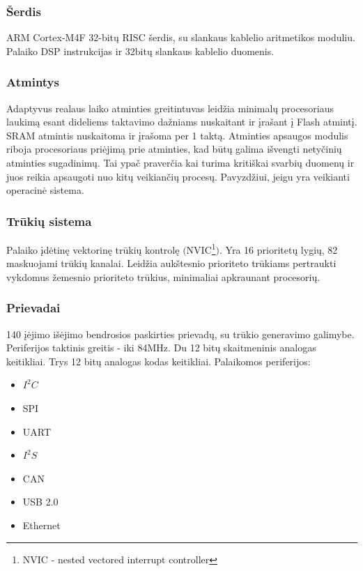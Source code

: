 \documentclass[a4paper, 12pt]{article} %
\begin{document}
\begin{onehalfspacing}
\subsubsection{\v{S}erdis}
ARM Cortex-M4F 32-bit\k{u} RISC \v{s}erdis, su slankaus kablelio aritmetikos moduliu. Palaiko DSP instrukcijas ir 32bit\k{u} slankaus kablelio duomenis.      


\subsubsection{Atmintys}
Adaptyvus realaus laiko atminties greitintuvas leid\v{z}ia minimal\k{u} procesoriaus laukim\k{a} esant dideliems taktavimo da\v{z}niams nuskaitant ir \k{i}ra\v{s}ant \k{i} Flash atmint\k{i}. SRAM atmintis nuskaitoma ir \k{i}ra\v{s}oma per 1 takt\k{a}. Atminties apsaugos modulis riboja procesoriaus pri\.ejim\k{a} prie atminties, kad b\=ut\k{u} galima i\v{s}vengti nety\v{c}ini\k{u} atminties sugadinim\k{u}. Tai ypa\v{c} praver\v{c}ia kai turima kriti\v{s}kai svarbi\k{u} duomen\k{u} ir juos reikia apsaugoti nuo kit\k{u} veikian\v{c}i\k{u} proces\k{u}. Pavyzd\v{z}iui, jeigu yra veikianti operacin\.e sistema.


\subsubsection{Tr\=uki\k{u} sistema}
Palaiko \k{i}d\.etin\k{e} vektorin\k{e} tr\=uki\k{u} kontrol\k{e} $($NVIC\footnote{NVIC - nested vectored interrupt controller}$)$.
Yra 16 prioritet\k{u} lygi\k{u}, 82 maskuojami tr\=uki\k{u} kanalai. Leid\v{z}ia auk\v{s}tesnio prioriteto tr\=ukiams pertraukti vykdomus \v{z}emesnio prioriteto tr\=ukius, minimaliai apkraunant procesori\k{u}. 


\subsubsection{Prievadai}    
140 \k{i}\.ejimo i\v{s}\.ejimo bendrosios paskirties prievad\k{u}, su tr\=ukio generavimo galimybe. Periferijos taktinis greitis - iki 84MHz. Du 12 bit\k{u} skaitmeninis analogas keitikliai. Trys 12 bit\k{u} analogas kodas keitikliai. 
Palaikomos periferijos:
\begin{itemize}
\item $I^2C$
\item SPI
\item UART
\item $I^2S$
\item CAN
\item USB 2.0
\item Ethernet
\end{itemize}


\end{onehalfspacing}
\end{document}
